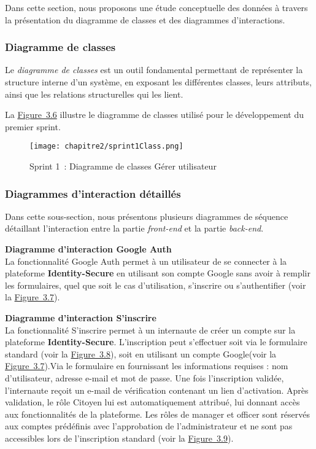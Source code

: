 Dans cette section, nous proposons une étude conceptuelle des données à travers la présentation du diagramme de classes et des diagrammes d'interactions.

\subsubsection{Diagramme de classes}

Le \textit{diagramme de classes} est un outil fondamental permettant de représenter la structure interne d'un système, en exposant les différentes classes, leurs attributs, ainsi que les relations structurelles qui les lient.

La \hyperref[fig:3.6]{Figure~3.6} illustre le diagramme de classes utilisé pour le développement du premier sprint.

\begin{figure}[H]
    \centering
    \texttt{[image: chapitre2/sprint1Class.png]}
    \caption{Sprint 1~: Diagramme de classes \og Gérer utilisateur \fg{}}
    \label{fig:3.6}
\end{figure}

\subsubsection{Diagrammes d'interaction détaillés}

Dans cette sous-section, nous présentons plusieurs diagrammes de séquence détaillant l'interaction entre la partie \textit{front-end} et la partie \textit{back-end}.

\medskip
\noindent\textbf{\textendash{} Diagramme d'interaction \og Google Auth \fg{}}\\
\hspace{1em}La fonctionnalité \og Google Auth \fg{} permet à un utilisateur de se connecter à la plateforme \textbf{Identity-Secure} en utilisant son compte Google sans avoir à remplir les formulaires, quel que soit le cas d'utilisation, s'inscrire ou s'authentifier (voir la \hyperref[fig:3.7]{Figure~3.7}).
\medskip

\noindent\textbf{\textendash{} Diagramme d'interaction \og S'inscrire \fg{}}\\
\hspace{1em}La fonctionnalité \og S'inscrire \fg{} permet à un internaute de créer un compte sur la plateforme \textbf{Identity-Secure}. L'inscription peut s'effectuer soit via le formulaire standard (voir la \hyperref[fig:3.8]{Figure~3.8}), soit en utilisant un compte Google(voir la \hyperref[fig:3.7]{Figure~3.7}).Via le formulaire en fournissant les informations requises : nom d'utilisateur, adresse e-mail et mot de passe. Une fois l'inscription validée, l'internaute reçoit un e-mail de vérification contenant un lien d'activation. Après validation, le rôle \og Citoyen \fg{} lui est automatiquement attribué, lui donnant accès aux fonctionnalités de la plateforme. Les rôles de \og manager \fg{} et \og officer \fg{} sont réservés aux comptes prédéfinis avec l'approbation de l'administrateur et ne sont pas accessibles lors de l'inscription standard (voir la \hyperref[fig:3.9]{Figure~3.9}).



